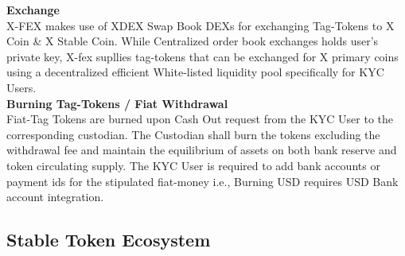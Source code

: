 \documentclass[letterpaper,11pt]{article}
\begin{document}
\textbf{Exchange}\\

X-FEX makes use of XDEX Swap Book DEXs for exchanging Tag-Tokens to X Coin \& X Stable Coin. While Centralized order book exchanges holds user's private key, X-fex supllies tag-tokens that can be exchanged for X primary coins using a decentralized efficient White-listed liquidity pool specifically for KYC Users.\\




\textbf{Burning Tag-Tokens / Fiat Withdrawal}\\

Fiat-Tag Tokens are burned upon Cash Out request from the KYC User to the corresponding custodian. The Custodian shall burn the tokens excluding the withdrawal fee and maintain the equilibrium of assets on both bank reserve and token circulating supply. The KYC User is required to add bank accounts or payment ids for the stipulated fiat-money i.e., Burning USD requires USD Bank account integration. 
	
\subsection{Stable Token Ecosystem}
\end{document}

